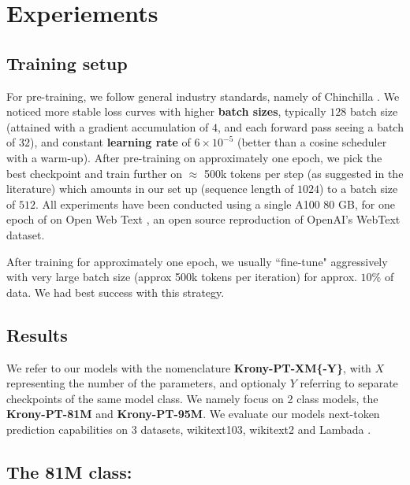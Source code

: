 \documentclass{article}
\begin{document}
{\[\]

\section{Experiements}%
\label{sub:Experiements}

\subsection{Training setup}%
\label{sub:Setup}

For pre-training, we follow general industry standards, namely of Chinchilla \cite{hoffmann2022training}. We noticed more stable loss curves with higher \textbf{batch sizes}, typically $128$ batch size (attained with a gradient accumulation of $4$, and each forward pass seeing a batch of $32$), and constant \textbf{learning rate} of $6 \times 10^{-5}$ (better than a cosine scheduler with a warm-up). After pre-training on approximately one epoch, we pick the best checkpoint and train further on $\approx$ 500k tokens per step (as suggested in the literature) which amounts in our set up (sequence length of $1024$) to a batch size of $512$. All experiments have been conducted using a single A100 80 GB, for one epoch of on Open Web Text \cite{Gokaslan2019OpenWeb}, an open source reproduction of OpenAI's WebText dataset.


After training for approximately one epoch, we usually ``fine-tune" aggressively with very large batch size (approx 500k tokens per iteration) for approx. $10\%$ of data. We had best success with this strategy.


\subsection{Results}%
\label{sub:results}

We refer to our models with the nomenclature \textbf{Krony-PT-XM\{-Y\}}, with $X$ representing the number of the parameters, and optionaly $Y$ referring to separate checkpoints of the same model class. We namely focus on 2 class models, the  \textbf{Krony-PT-81M} and \textbf{Krony-PT-95M}. We evaluate our models next-token prediction capabilities on 3 datasets, wikitext103, wikitext2 \cite{merity2016pointer} and Lambada \cite{paperno2016lambada}. 

\subsection{The 81M class:}%
\label{sub:The 81M class:}

}
\end{document}
